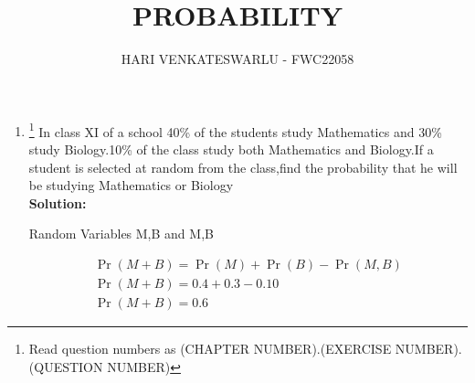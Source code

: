 \documentclass{article}
\providecommand{\pr}[1]{\ensuremath{\Pr\left(#1\right)}}
\newcommand{\solution}{\noindent \textbf{Solution: }}
\providecommand{\pr}[1]{\ensuremath{\Pr\left(#1\right)}}
\begin{document}
\title{PROBABILITY}
\author{\Large HARI VENKATESWARLU - FWC22058}
\date{}

\maketitle

\begin{enumerate}[label=16.\arabic{enumi}.\arabic{enumii}]%
\setcounter{enumi}{2}
\setcounter{enumii}{18}

\item \footnote{Read question numbers as (CHAPTER NUMBER).(EXERCISE NUMBER).(QUESTION NUMBER)} {In class XI of a school 40\% of the students study Mathematics and 30\% study Biology.10\% of the class study both Mathematics and Biology.If a student is selected at random from the class,find the probability that he will be studying Mathematics or Biology}\\[1ex]
	\solution\\
	
\begin{table}[h]
	
	\caption{Random Variables M,B and M,B}\label{table1:}
\end{table}
	\begin{align}
	  &\pr{M+B}=\pr{M}+\pr{B}-\pr{M,B}&\\
	  &\pr{M+B}=0.4+0.3-0.10&\\
	  &\pr{M+B}=0.6&
\end{align}
\end{enumerate}
\end{document}
